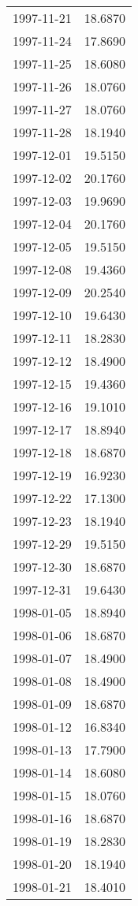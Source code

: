 \begin{tabular}{lr}
1997-11-21 &     18.6870 \\
1997-11-24 &     17.8690 \\
1997-11-25 &     18.6080 \\
1997-11-26 &     18.0760 \\
1997-11-27 &     18.0760 \\
1997-11-28 &     18.1940 \\
1997-12-01 &     19.5150 \\
1997-12-02 &     20.1760 \\
1997-12-03 &     19.9690 \\
1997-12-04 &     20.1760 \\
1997-12-05 &     19.5150 \\
1997-12-08 &     19.4360 \\
1997-12-09 &     20.2540 \\
1997-12-10 &     19.6430 \\
1997-12-11 &     18.2830 \\
1997-12-12 &     18.4900 \\
1997-12-15 &     19.4360 \\
1997-12-16 &     19.1010 \\
1997-12-17 &     18.8940 \\
1997-12-18 &     18.6870 \\
1997-12-19 &     16.9230 \\
1997-12-22 &     17.1300 \\
1997-12-23 &     18.1940 \\
1997-12-29 &     19.5150 \\
1997-12-30 &     18.6870 \\
1997-12-31 &     19.6430 \\
1998-01-05 &     18.8940 \\
1998-01-06 &     18.6870 \\
1998-01-07 &     18.4900 \\
1998-01-08 &     18.4900 \\
1998-01-09 &     18.6870 \\
1998-01-12 &     16.8340 \\
1998-01-13 &     17.7900 \\
1998-01-14 &     18.6080 \\
1998-01-15 &     18.0760 \\
1998-01-16 &     18.6870 \\
1998-01-19 &     18.2830 \\
1998-01-20 &     18.1940 \\
1998-01-21 &     18.4010 \\

\end{tabular}
